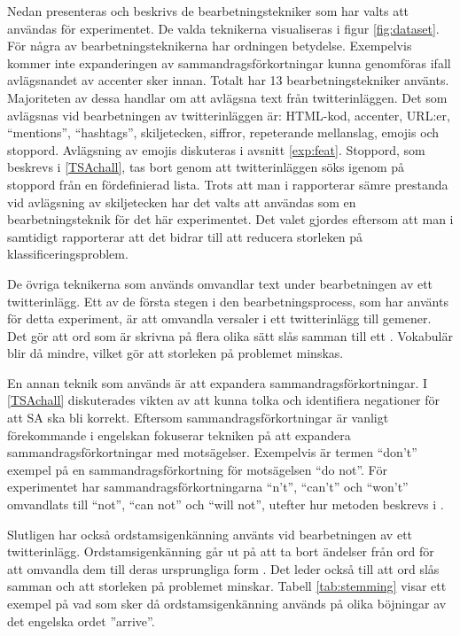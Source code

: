 \documentclass{kaumasters} %
\begin{document}
Nedan presenteras och beskrivs de bearbetningstekniker som har valts att användas för experimentet. De valda teknikerna visualiseras i figur \ref{fig:dataset}. För några av bearbetningsteknikerna har ordningen betydelse. Exempelvis kommer inte expanderingen av sammandragsförkortningar kunna genomföras ifall avlägsnandet av accenter sker innan. Totalt har 13 bearbetningstekniker använts. Majoriteten av dessa handlar om att avlägsna text från twitterinläggen. Det som avlägsnas vid bearbetningen av twitterinläggen är: HTML-kod, accenter, URL:er, “mentions”, “hashtags”, skiljetecken, siffror, repeterande mellanslag, emojis och stoppord. Avlägsning av emojis diskuteras i avsnitt \ref{exp:feat}. Stoppord, som beskrevs i \ref{TSAchall}, tas bort genom att twitterinläggen söks igenom på stoppord från en fördefinierad lista. Trots att man i \cite{effrosynidis2017comparison} rapporterar sämre prestanda vid avlägsning av skiljetecken har det valts att användas som en bearbetningsteknik för det här experimentet. Det valet gjordes eftersom att man i  \cite{effrosynidis2017comparison} samtidigt rapporterar att det bidrar till att reducera storleken på klassificeringsproblem. 

De övriga teknikerna som används omvandlar text under bearbetningen av ett twitterinlägg. Ett av de första stegen i den bearbetningsprocess, som har använts för detta experiment, är att omvandla versaler i ett twitterinlägg till gemener. Det gör att ord som är skrivna på flera olika sätt slås samman till ett \cite{effrosynidis2017comparison}. Vokabulär blir då mindre, vilket gör att storleken på problemet minskas.

En annan teknik som används är att expandera sammandragsförkortningar.  I \ref{TSAchall} diskuterades vikten av att kunna tolka och identifiera negationer för att SA ska bli korrekt. Eftersom sammandragsförkortningar är vanligt förekommande i engelskan fokuserar tekniken på att expandera sammandragsförkortningar med motsägelser. Exempelvis är termen “don’t” exempel på en sammandragsförkortning för motsägelsen “do not”. För experimentet har sammandragsförkortningarna “n’t”, “can’t” och “won’t” omvandlats till “not”, “can not” och “will not”, utefter hur metoden beskrevs i \cite{7862202}.

Slutligen har också ordstamsigenkänning använts vid bearbetningen av ett twitterinlägg. Ordstamsigenkänning går ut på att ta bort ändelser från ord för att omvandla dem till deras ursprungliga form \cite{effrosynidis2017comparison}. Det leder också till att ord slås samman och att storleken på problemet minskar. Tabell \ref{tab:stemming} visar ett exempel på vad som sker då ordstamsigenkänning används på olika böjningar av det engelska ordet ''arrive''.
\end{document}
